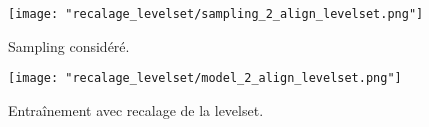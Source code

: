 \begin{minipage}{0.48\linewidth}
	\begin{figure}[H]
		\centering
		\texttt{[image: "recalage\_levelset/sampling\_2\_align\_levelset.png"]}
		\caption{Sampling considéré.}
		\label{sampling_2_align_levelset}
	\end{figure}
\end{minipage}
\begin{minipage}{0.48\linewidth}
	\begin{figure}[H]
		\centering
		\texttt{[image: "recalage\_levelset/model\_2\_align\_levelset.png"]}
		\caption{Entraînement avec recalage de la levelset.}
		\label{model_2_align_levelset}
	\end{figure}
\end{minipage}
